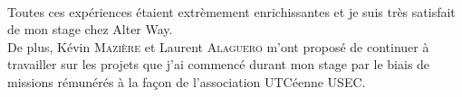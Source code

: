 \paragraph*{}
Toutes ces expériences étaient extrèmement enrichissantes et je suis très satisfait de mon stage chez Alter Way.\\
De plus, Kévin \textsc{Mazière} et Laurent \textsc{Alaguero} m'ont proposé de continuer à travailler sur les projets que j'ai commencé durant mon stage
par le biais de missions rémunérés à la façon de l'association UTCéenne USEC.

%
%



